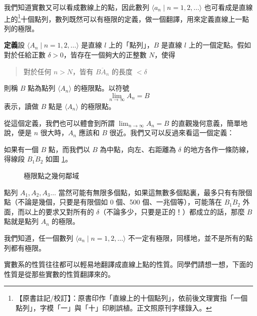 我們知道實數又可以看成數線上的點，因此數列 $\langle a_n \mid n=1,2,\dots \rangle$ 也可看成是直線上的\label{note:b3s-a1-p276-ten}\footnote{【原書註記/校訂】：原書印作「直線上的十個點列」，依前後文理實指「一個點列」，字模「一」與「十」印刷誤植。正文照原刊字樣錄入。}十個點列，數列既然可以有極限的定義，做一個翻譯，用來定義直線上一點列的極限。

\noindent\textbf{定義}\quad 設 $\langle A_n \mid n=1,2,\dots \rangle$ 是直線 $l$ 上的「點列」，$B$ 是直線 $l$ 上的一個定點。假如對於任給正數 $\delta > 0$，皆存在一個夠大的正整數 $N$，使得
\begin{quote}
  對於任何 $n > N$，皆有 $\overline{BA_n}$ 的長度 $< \delta$
\end{quote}
則稱 $B$ 點為點列 $\langle A_n \rangle$ 的極限點。以符號
\[ \lim_{n \to \infty} A_n = B \]
表示，讀做 $B$ 點是 $\langle A_n \rangle$ 的極限點。

從這個定義，我們也可以體會到所謂 $\lim_{n \to \infty} A_n = B$ 的直觀幾何意義，簡單地說，便是 $n$ 很大時，$A_n$ 應該和 $B$ 很近。我們又可以反過來看這一個定義：

如果有一個 $B$ 點，而我們以 $B$ 為中點，向左、右距離為 $\delta$ 的地方各作一條防線，得線段 $\overline{B_1B_2}$ 如圖 \ref{fig:b3s-a1-23}。

\begin{figure}[H]
\centering
{}
\caption{極限點之幾何鄰域}
\label{fig:b3s-a1-23}
\end{figure}

點列 $A_1, A_2, A_3 \dots$ 當然可能有無限多個點，如果這無數多個點裏，最多只有有限個點（不論是幾個，只要是有限個如 0 個、500 個、一兆個等），可能落在 $\overline{B_1B_2}$ 外面，而以上的要求又對所有的 $\delta$（不論多少，只要是正的！）都成立的話，那麼 $B$ 點就是點列 $A_n$ 的極限。

我們知道，任一個數列 $\langle a_n \mid n=1,2,\dots \rangle$ 不一定有極限，同樣地，並不是所有的點列都有極限。

實數系的性質往往都可以輕易地翻譯成直線上點的性質。同學們請想一想，下面的性質是從那些實數的性質翻譯來的。

